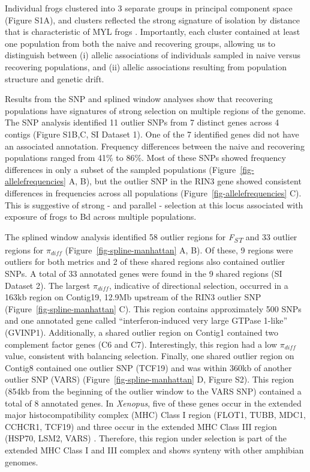 \documentclass[9pt,twocolumn,twoside,lineno]{pnas-new}
\begin{document}
Individual frogs clustered into 3 separate groups in principal component
space (Figure S1A), and clusters reflected
the strong signature of isolation by distance that is characteristic of
MYL frogs \citep{rothstein2020, poorten2017}. Importantly, each cluster
contained at least one population from both the naive and recovering
groups, allowing us to distinguish between (i) allelic associations of
individuals sampled in naive versus recovering populations, and (ii)
allelic associations resulting from population structure and genetic
drift.

Results from the SNP and splined window analyses show that recovering
populations have signatures of strong selection on multiple regions of
the genome. The SNP analysis identified 11 outlier SNPs from 7 distinct
genes across 4 contigs (Figure S1B,C, SI
Dataset 1). One of the 7 identified genes did not have an associated
annotation. Frequency differences between the naive and recovering
populations ranged from 41\% to 86\%. Most of these SNPs showed
frequency differences in only a subset of the sampled populations
(Figure~\ref{fig-allelefrequencies} A, B), but the outlier SNP in the
RIN3 gene showed consistent differences in frequencies across all
populations (Figure~\ref{fig-allelefrequencies} C). This is suggestive
of strong - and parallel - selection at this locus associated with
exposure of frogs to Bd across multiple populations.

The splined window analysis identified 58 outlier regions for
\emph{F\textsubscript{ST}} and 33 outlier regions for \(\pi_{diff}\)
(Figure~\ref{fig-spline-manhattan} A, B). Of these, 9 regions were
outliers for both metrics and 2 of these shared regions also contained
outlier SNPs. A total of 33 annotated genes were found in the 9 shared
regions (SI Dataset 2). The largest \(\pi_{diff}\), indicative of
directional selection, occurred in a 163kb region on Contig19, 12.9Mb
upstream of the RIN3 outlier SNP (Figure~\ref{fig-spline-manhattan} C).
This region contains approximately 500 SNPs and one annotated gene
called ``interferon-induced very large GTPase 1-like'' (GVINP1).
Additionally, a shared outlier region on Contig1 contained two
complement factor genes (C6 and C7). Interestingly, this region had a
low \(\pi_{diff}\) value, consistent with balancing selection. Finally,
one shared outlier region on Contig8 contained one outlier SNP (TCF19)
and was within 360kb of another outlier SNP (VARS)
(Figure~\ref{fig-spline-manhattan} D, Figure S2).
This region (854kb from the beginning of the outlier window to the VARS
SNP) contained a total of 8 annotated genes. In \emph{Xenopus}, five of
these genes occur in the extended major histocompatibility complex (MHC)
Class I region (FLOT1, TUBB, MDC1, CCHCR1, TCF19) and three occur in the
extended MHC Class III region (HSP70, LSM2, VARS) \citep{ohta2006}.
Therefore, this region under selection is part of the extended MHC Class
I and III complex and shows synteny with other amphibian genomes.
\end{document}

